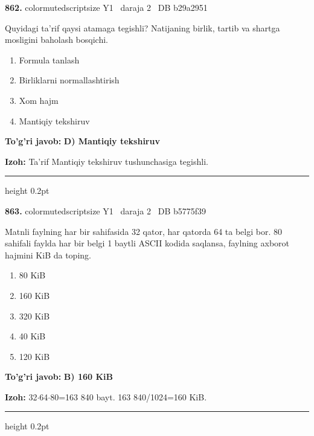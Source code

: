 \documentclass[10pt,a4paper,oneside]{article}
\begin{document}
\noindent\textbf{\color{ink}862.}  {color{muted}scriptsize Y1 \textbullet\ daraja 2 \textbullet\ DB b29a2951}
\par
Quyidagi ta'rif qaysi atamaga tegishli? Natijaning birlik, tartib va shartga mosligini baholash bosqichi.
\begin{enumerate}[label=\Alph*),leftmargin=9mm]
\item Formula tanlash
\item Birliklarni normallashtirish
\item Xom hajm
\item Mantiqiy tekshiruv
\end{enumerate}
\begin{tcolorbox}[enhanced,breakable,colback=teal!4,colframe=teal!50!black,boxrule=0.5pt,arc=1.1mm,left=3mm,right=3mm,top=1.7mm,bottom=1.7mm,before skip=2mm,after skip=2mm]
\textbf{\color{teal}To'g'ri javob:} \textbf{D) Mantiqiy tekshiruv}
\par\smallskip
\textbf{Izoh:} Ta'rif Mantiqiy tekshiruv tushunchasiga tegishli.
\end{tcolorbox}
\vspace{2mm}\hrule height 0.2pt \vspace{3mm}

\noindent\textbf{\color{ink}863.}  {color{muted}scriptsize Y1 \textbullet\ daraja 2 \textbullet\ DB b5775f39}
\par
Matnli faylning har bir sahifasida 32 qator, har qatorda 64 ta belgi bor. 80 sahifali faylda har bir belgi 1 baytli ASCII kodida saqlansa, faylning axborot hajmini KiB da toping.
\begin{enumerate}[label=\Alph*),leftmargin=9mm]
\item 80 KiB
\item 160 KiB
\item 320 KiB
\item 40 KiB
\item 120 KiB
\end{enumerate}
\begin{tcolorbox}[enhanced,breakable,colback=teal!4,colframe=teal!50!black,boxrule=0.5pt,arc=1.1mm,left=3mm,right=3mm,top=1.7mm,bottom=1.7mm,before skip=2mm,after skip=2mm]
\textbf{\color{teal}To'g'ri javob:} \textbf{B) 160 KiB}
\par\smallskip
\textbf{Izoh:} 32\ensuremath{\cdot}64\ensuremath{\cdot}80=163 840 bayt. 163 840/1024=160 KiB.
\end{tcolorbox}
\vspace{2mm}\hrule height 0.2pt \vspace{3mm}
\end{document}
